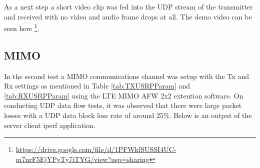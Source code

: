 As a next step a short video clip was fed into the UDP stream of the transmitter and received with no video and audio frame drops at all. The demo video can be seen here \footnote{\url{https://drive.google.com/file/d/1PFWkfSUSSI4UC-m7nrF5EjYPyTy7iTYG/view?usp=sharing}}.

\subsection{MIMO}\label{ssec:MIMOOTA}

In the second test a MIMO communications channel was setup with the Tx and Rx settings as mentioned in Table \ref{tab:TXUSRPParam} and \ref{tab:RXUSRPParam} using the LTE MIMO AFW 2x2 extention software. On conducting UDP data flow tests, it was observed that there were large packet losses with a UDP data block loss rate of around $25\%$. Below is an output of the server client iperf application.


